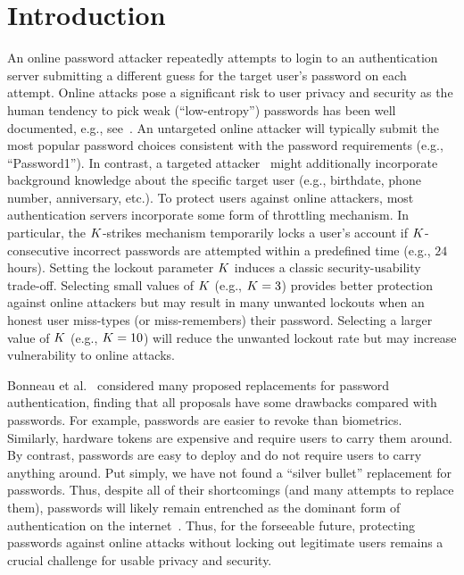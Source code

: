 
\section{Introduction}\label{sec: Introduction}
\vspace*{-\baselineskip}
An online password attacker repeatedly attempts to login to an authentication server submitting a different guess for the target user's password on each attempt. Online attacks pose a significant risk to user privacy and security as the human tendency to pick weak (``low-entropy'') passwords has been well documented, e.g., see~\cite{SP:Bonneau12}. An untargeted online attacker will typically submit the most popular password choices consistent with the password requirements (e.g., ``Password1''). In contrast, a targeted attacker~\cite{CCS:WZWYH16} might additionally incorporate background knowledge about the specific target user (e.g., birthdate, phone number, anniversary, etc.). To protect users against online attackers, most authentication servers incorporate some form of throttling mechanism. In particular, the $K$-strikes mechanism temporarily locks a user's account if $K$-consecutive incorrect passwords are attempted within a predefined time (e.g., $24$ hours). Setting the lockout parameter $K$ induces a classic security-usability trade-off. Selecting small values of $K$ (e.g., $K=3$) provides better protection against online attackers but may result in many unwanted lockouts when an honest user miss-types (or miss-remembers) their password. Selecting a larger value of $K$ (e.g., $K=10$) will reduce the unwanted lockout rate but may increase vulnerability to online attacks. 



Bonneau et al.~\cite{SP:BHVS12} considered many proposed replacements for password authentication, finding that all proposals have some drawbacks compared with passwords. For example, passwords are easier to revoke than biometrics. Similarly, hardware tokens are expensive and require users to carry them around. By contrast, passwords are easy to deploy and do not require users to carry anything around. Put simply, we have not found a ``silver bullet'' replacement for passwords. Thus, despite all of their shortcomings (and many attempts to replace them), passwords will likely remain entrenched as the dominant form of authentication on the internet~\cite{PasswordPersistence}. Thus, for the forseeable future, protecting passwords against online attacks without locking out legitimate users remains a crucial challenge for usable privacy and security. 


